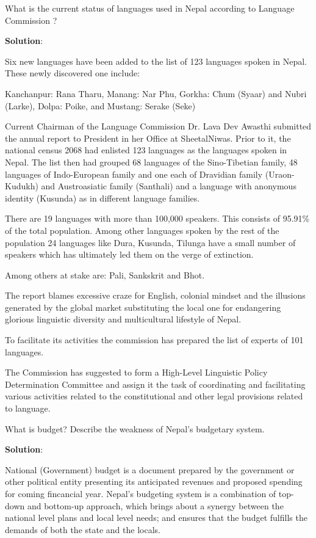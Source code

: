\documentclass[
]{book}
\newcommand{\question}{\item}
\newenvironment{solution}{ {\bfseries Solution}:}{}
\begin{document}
\begin{questions}
\question What is the current status of languages used in Nepal according to Language Commission ?

\begin{solution}

Six new languages have been added to the list of 123 languages spoken in Nepal. These newly discovered one include:

Kanchanpur: Rana Tharu,
Manang: Nar Phu,
Gorkha: Chum (Syaar) and Nubri (Larke),
Dolpa: Poike, and
Mustang: Serake (Seke)

Current Chairman of the Language Commission Dr. Lava Dev Awasthi submitted the annual report to President in her Office at SheetalNiwas. Prior to it, the national census 2068 had enlisted 123 languages as the languages spoken in Nepal. The list then had grouped 68 languages of the Sino-Tibetian family, 48 languages of Indo-European family and one each of Dravidian family (Uraon-Kudukh) and Austroasiatic family (Santhali) and a language with anonymous identity (Kusunda) as in different language families.

There are 19 languages with more than 100,000 speakers. This consists of 95.91\% of the total population. Among other languages spoken by the rest of the population 24 languages like Dura, Kusunda, Tilunga have a small number of speakers which has ultimately led them on the verge of extinction.

Among others at stake are: Pali, Sankskrit and Bhot.

The report blames excessive craze for English, colonial mindset and the illusions generated by the global market substituting the local one for endangering glorious linguistic diversity and multicultural lifestyle of Nepal.

To facilitate its activities the commission has prepared the list of experts of 101 languages.

The Commission has suggested to form a High-Level Linguistic Policy Determination Committee and assign it the task of coordinating and facilitating various activities related to the constitutional and other legal provisions related to language.

\end{solution}

\question What is budget? Describe the weakness of Nepal's budgetary system.

\begin{solution}

National (Government) budget is a document prepared by the government or other political entity presenting its anticipated revenues and proposed spending for coming fincancial year. Nepal's budgeting system is a combination of top-down and bottom-up approach, which brings about a synergy between the national level plans and local level needs; and ensures that the budget fulfills the demands of both the state and the locals.


\end{solution}
\end{questions}
\end{document}

